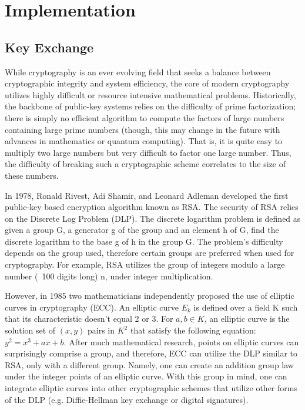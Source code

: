 \section{Implementation}

\subsection{Key Exchange}
While cryptography is an ever evolving field that seeks a balance between cryptographic integrity and system efficiency, the core of modern cryptography utilizes highly difficult or resource intensive mathematical problems. Historically, the backbone of public-key systems relies on the difficulty of prime factorization; there is simply no efficient algorithm to compute the factors of large numbers containing large prime numbers (though, this may change in the future with advances in mathematics or quantum computing). That is, it is quite easy to multiply two large numbers but very difficult to factor one large number. Thus, the difficulty of breaking such a cryptographic scheme correlates to the size of these numbers.

In 1978, Ronald Rivest, Adi Shamir, and Leonard Adleman developed the first public-key based encryption algorithm known as RSA. The security of RSA relies on the Discrete Log Problem (DLP). The discrete logarithm problem is defined as given a group G, a generator g of the group and an element h of G, find the discrete logarithm to the base g of h in the group G. The problem's difficulty depends on the group used, therefore certain groups are preferred when used for cryptography. For example, RSA utilizes the group of integers modulo a large number (~100 digits long) n, under integer multiplication. 

However, in 1985 two mathematicians independently proposed the use of elliptic curves in cryptography (ECC). An elliptic curve $E_k$ is defined over a field K such that its characteristic doesn't equal 2 or 3. For $a,b \in K$, an elliptic curve is the solution set of $(x,y)$ pairs in $K^2$ that satisfy the following equation: $y^2 = x^3 + ax + b$. After much mathematical research, points on elliptic curves can surprisingly comprise a group, and therefore, ECC can utilize the DLP similar to RSA, only with a different group. Namely, one can create an addition group law under the integer points of an elliptic curve. With this group in mind, one can integrate elliptic curves into other cryptographic schemes that utilize other forms of the DLP (e.g. Diffie-Hellman key exchange or digital signatures).

